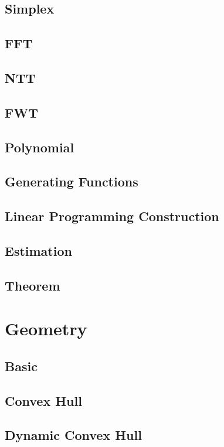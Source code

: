 \subsection{Simplex}

\subsection{FFT}

\subsection{NTT}

\subsection{FWT}

\subsection{Polynomial}

\subsection{Generating Functions}

\subsection{Linear Programming Construction}

\subsection{Estimation}

\subsection{Theorem}


\section{Geometry}
\subsection{Basic}

\subsection{Convex Hull}

\subsection{Dynamic Convex Hull}

